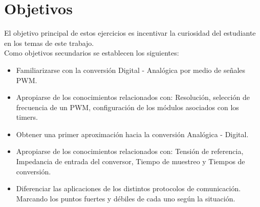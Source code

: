 \documentclass[10pt,conference,a4paper,onecolumn]{article}%
\begin{document}






\section{Objetivos}
El objetivo principal de estos ejercicios es incentivar la curiosidad del estudiante en los temas de este trabajo.\\
Como objetivos secundarios se establecen los siguientes:
\begin{itemize}
\item Familiarizarse con la conversión Digital - Analógica por medio de señales PWM. 
\item Apropiarse de los conocimientos relacionados con: Resolución, selección de frecuencia de un PWM, configuración de los módulos asociados con los timers.  
\item Obtener una primer aproximación hacia la conversión Analógica - Digital.
\item Apropiarse de los conocimientos relacionados con: Tensión de referencia, Impedancia de entrada del conversor, Tiempo de muestreo y Tiempos de conversión. 
\item Diferenciar las aplicaciones de los distintos protocolos de comunicación. Marcando los puntos fuertes y débiles de cada uno según la situación.  
\end{itemize}
 
\end{document}
